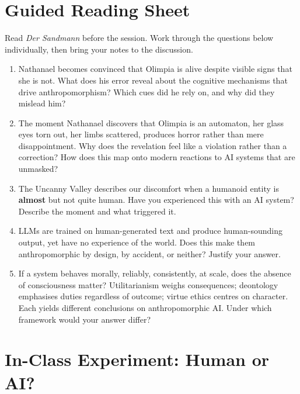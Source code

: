 \vspace{3.5em}

\section*{Guided Reading Sheet}

\noindent Read \textit{Der Sandmann} before the session. Work through the
questions below individually, then bring your notes to the discussion.

\begin{enumerate}
    \item Nathanael becomes convinced that Olimpia is alive despite
    visible signs that she is not. What does his error reveal about
    the cognitive mechanisms that drive anthropomorphism? Which cues
    did he rely on, and why did they mislead him?

    \item The moment Nathanael discovers that Olimpia is an automaton,
    her glass eyes torn out, her limbs scattered, produces horror
    rather than mere disappointment. Why does the revelation feel like
    a violation rather than a correction? How does this map onto modern
    reactions to AI systems that are unmasked?

    \item The Uncanny Valley describes our discomfort when a humanoid
    entity is \textbf{almost} but not quite human. Have you experienced
    this with an AI system? Describe the moment and what triggered it.

    \item LLMs are trained on human-generated text and produce
    human-sounding output, yet have no experience of the world. Does
    this make them anthropomorphic by design, by accident, or neither?
    Justify your answer.

    \item If a system behaves morally, reliably, consistently, at
    scale, does the absence of consciousness matter? Utilitarianism
    weighs consequences; deontology emphasises duties regardless of
    outcome; virtue ethics centres on character. Each yields different
    conclusions on anthropomorphic AI\cite{floridi2019unified}. Under
    which framework would your answer differ?\\
\end{enumerate}




\section*{In-Class Experiment: Human or AI?}


